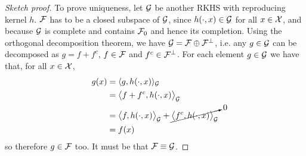 \begin{proof}[Sketch proof]
  To prove uniqueness, let ${\mathcal G}$ be another RKHS with reproducing kernel $h$.
  ${\mathcal F}$ has to be a closed subspace of ${\mathcal G}$, since $h(\cdot,x) \in {\mathcal G}$ for all $x\in{\mathcal X}$, and because ${\mathcal G}$ is complete and contains ${\mathcal F}_0$ and hence its completion.
  Using the orthogonal decomposition theorem, we have ${\mathcal G} = {\mathcal F} \oplus {\mathcal F}^\bot$, i.e. any $g\in{\mathcal G}$ can be decomposed as $g = f + f^c$, $f\in{\mathcal F}$ and $f^c\in{\mathcal F}^\bot$.
  For each element $g\in{\mathcal G}$ we have that, for all $x\in{\mathcal X}$,
  \begin{align*}
    g(x) &= \langle g,h(\cdot,x)\rangle_{\mathcal G} \\
    &= \big\langle f+f^c, h(\cdot,x) \big\rangle_{\mathcal G} \\
    &= \big\langle f, h(\cdot,x) \big\rangle_{\mathcal G} + \cancelto{0}{\big\langle f^c, h(\cdot,x) \big\rangle_{\mathcal G}} \\
    &= f(x)
  \end{align*}
  so therefore $g\in{\mathcal F}$ too.
  It must be that ${\mathcal F}\equiv{\mathcal G}$.
%  
%  

\end{proof}
